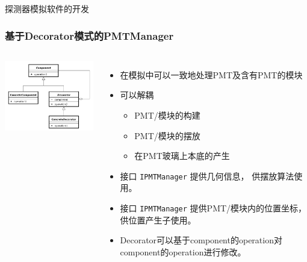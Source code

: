 \begin{frame}
    \begin{center}
        \Large 探测器模拟软件的开发
    \end{center}
\end{frame}

\begin{frame}
    \frametitle{基于Decorator模式的PMTManager}
    \begin{columns}
        \column{6.0cm}
        \includegraphics[width=6cm,keepaspectratio]{data/Decorator_UML_class_diagram.svg.png}
        \column{6.0cm}
        \begin{itemize}
            \item 在模拟中可以一致地处理PMT及含有PMT的模块
            \item 可以解耦
                \begin{itemize}
                    \item PMT/模块的构建
                    \item PMT/模块的摆放
                    \item 在PMT玻璃上本底的产生
                \end{itemize}
            \item 接口 {\tt IPMTManager} 提供几何信息，
                  供摆放算法使用。
            \item 接口 {\tt IPMTManager} 提供PMT/模块内的位置坐标，
                  供位置产生子使用。
            \item Decorator可以基于component的operation对
                  component的operation进行修改。
        \end{itemize}
    \end{columns}
\end{frame}

